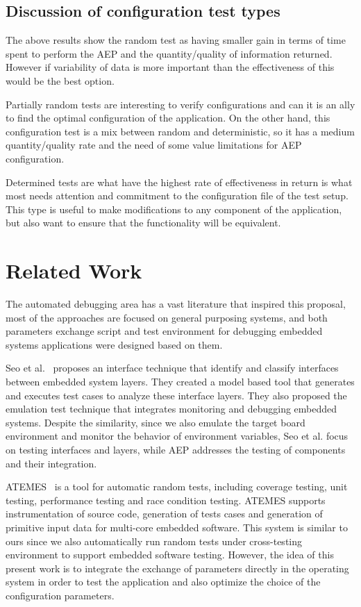 \documentclass[conference]{IEEEtran}
\begin{document}
\subsection{Discussion of configuration test types}
The above results show the random test as having smaller gain in terms of time spent to perform the AEP and the quantity/quality of information returned. However if variability of data is more important than the effectiveness of this would be the best option.

Partially random tests are interesting to verify configurations and can it is an ally to find the optimal configuration of the application. On the other hand, this configuration test is a mix between random and deterministic, so it has a medium quantity/quality rate and the need of some value limitations for AEP configuration.

Determined tests are what have the highest rate of effectiveness in return is what most needs attention and commitment to the configuration file of the test setup. This type is useful to make modifications to any component of the application, but also want to ensure that the functionality will be equivalent.

\section{Related Work}
The automated debugging area has a vast literature that inspired this proposal, most of the approaches are focused on general purposing systems, and both parameters exchange script and test environment for debugging embedded systems applications were designed based on them.

Seo et al.~\cite{seo} proposes an interface technique that identify and classify interfaces between embedded system layers. They created a model based tool that generates and executes test cases to analyze these interface layers. They also proposed the emulation test technique that integrates monitoring and debugging embedded systems. Despite the similarity, since we also emulate the target board environment and monitor the behavior of environment variables, Seo et al. focus on testing interfaces and layers, while AEP addresses the testing of components and their integration.

ATEMES~\cite{atemes} is a tool for automatic random tests, including coverage testing, unit testing, performance testing and race condition testing. ATEMES supports instrumentation of source code, generation of tests cases and generation of primitive input data for multi-core embedded software. This system is similar to ours since we also automatically run random tests under cross-testing environment to support embedded software testing. However, the idea of this present work is to integrate the exchange of parameters directly in the operating system in order to test the application and also optimize the choice of the configuration parameters.
\end{document}
